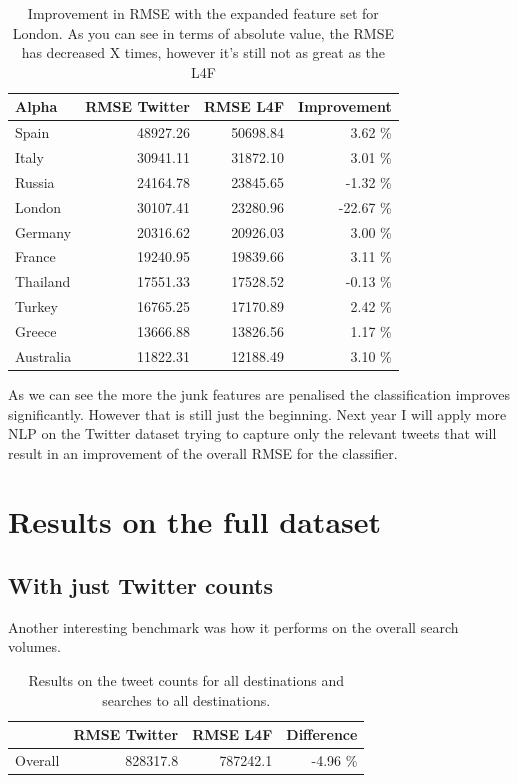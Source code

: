 \documentclass[minf,frontabs,twoside,singlespacing,parskip]{infthesis}
\begin{document}
\begin{table}[h]
\begin{center}
\begin{tabular}{ l | r | r | r}
Alpha & RMSE Twitter & RMSE L4F & Improvement \\
\hline
Spain & 48927.26 & 50698.84 & 3.62 \% \\ 
Italy & 30941.11 & 31872.10 & 3.01 \% \\ 
Russia & 24164.78 & 23845.65 & -1.32 \% \\ 
London & 30107.41 & 23280.96 & -22.67 \% \\ 
Germany & 20316.62 & 20926.03 & 3.00 \% \\ 
France & 19240.95 & 19839.66 & 3.11 \% \\ 
Thailand & 17551.33 & 17528.52 & -0.13 \% \\ 
Turkey & 16765.25 & 17170.89 & 2.42 \% \\ 
Greece & 13666.88 & 13826.56 & 1.17 \% \\ 
Australia & 11822.31 & 12188.49 & 3.10 \% \\
\end{tabular}
\end{center}
\caption{Improvement in RMSE with the expanded feature set for London. As you can see in terms of absolute value, the RMSE has decreased X times, however it's still not as great as the L4F}
\end{table}

As we can see the more the junk features are penalised the classification improves significantly. However that is still just the beginning. Next year I will apply more NLP on the Twitter dataset trying to capture only the relevant tweets that will result in an improvement of the overall RMSE for the classifier. 

\section{Results on the full dataset}

\subsection{With just Twitter counts}

Another interesting benchmark was how it performs on the overall search volumes. 

\begin{table}[h]
\begin{center}
\begin{tabular}{ l | r | r | r}
 & RMSE Twitter & RMSE L4F & Difference \\
\hline
Overall & 828317.8 & 787242.1 & -4.96 \% \\
\end{tabular}
\end{center}
\caption{Results on the tweet counts for all destinations and searches to all destinations. }
\end{table}
\end{document}
